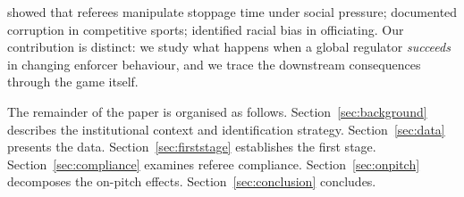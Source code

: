 \citet{garicano2005favoritism} showed that referees manipulate stoppage
time under social pressure; \citet{dugganlevitt2002} documented
corruption in competitive sports; \citet{pricewolfers2010} identified
racial bias in officiating.  Our contribution is distinct: we study
what happens when a global regulator \emph{succeeds} in changing
enforcer behaviour, and we trace the downstream consequences through
the game itself.

The remainder of the paper is organised as follows.
Section~\ref{sec:background} describes the institutional context and
identification strategy.  Section~\ref{sec:data} presents the data.
Section~\ref{sec:firststage} establishes the first stage.
Section~\ref{sec:compliance} examines referee compliance.
Section~\ref{sec:onpitch} decomposes the on-pitch effects.
Section~\ref{sec:conclusion} concludes.
